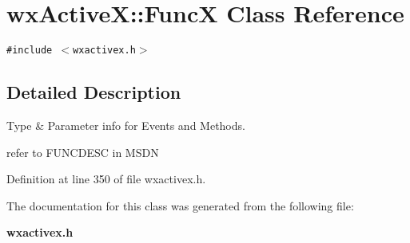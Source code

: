 \section{wx\-Active\-X::Func\-X Class Reference}
\label{classwxActiveX_1_1FuncX}
{\tt \#include $<$wxactivex.h$>$}



\subsection{Detailed Description}
Type \& Parameter info for Events and Methods.

refer to FUNCDESC in MSDN 



Definition at line 350 of file wxactivex.h.

The documentation for this class was generated from the following file:\begin{CompactItemize}
\item 
{\bf wxactivex.h}\end{CompactItemize}
